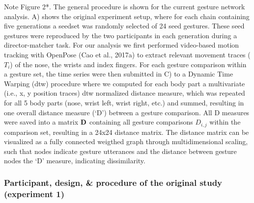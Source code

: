 \documentclass[
  man, noextraspace,floatsintext]{apa6}
\begin{document}
\small *Note Figure 2*. The general procedure is shown for the current gesture network analysis. A) shows the original experiment setup, where for each chain containing five generations a seedset was randomly selected of 24 seed gestures. These seed gestures were reproduced by the two participants in each generation during a director-matcher task. For our analysis we first performed video-based motion tracking with OpenPose (Cao et al., 2017a) to extract relevant movement traces (\(T_{i}\)) of the nose, the wrists and index fingers. For each gesture comparison within a gesture set, the time series were then submitted in C) to a Dynamic Time Warping (dtw) procedure where we computed for each body part a multivariate (i.e., x, y position traces) dtw normalized distance measure, which was repeated for all 5 body parts (nose, wrist left, wrist right, etc.) and summed, resulting in one overall distance measure (`D') between a gesture comparison. All D measures were saved into a matrix \(\textbf{\mbox{D}}\) containing all gesture comparisons \(D_{i,j}\) within the comparison set, resulting in a 24x24 distance matrix. The distance matrix can be visualized as a fully connected weigthed graph through multidimensional scaling, such that nodes indicate gesture utterances and the distance between gesture nodes the `D' measure, indicating dissimilarity. \normalsize 

\hypertarget{participant-design-procedure-of-the-original-study-experiment-1}{%
\subsubsection{Participant, design, \& procedure of the original study (experiment 1)}\label{participant-design-procedure-of-the-original-study-experiment-1}}
\end{document}

